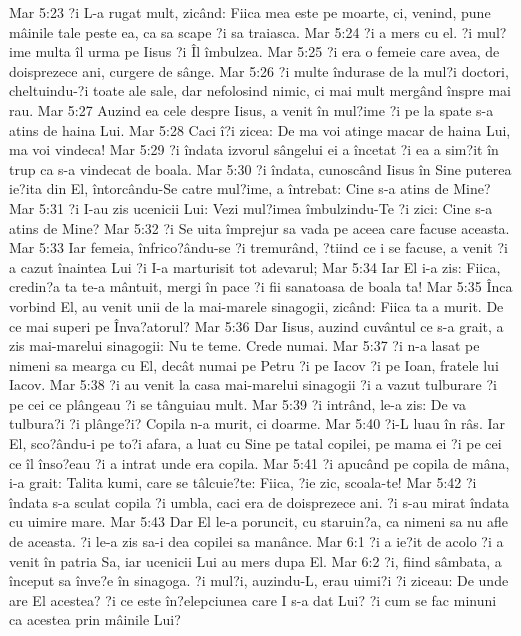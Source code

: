 Mar 5:23  ?i L-a rugat mult, zicând: Fiica mea este pe moarte, ci, venind, pune mâinile tale peste ea, ca sa scape ?i sa traiasca.
Mar 5:24  ?i a mers cu el. ?i mul?ime multa îl urma pe Iisus ?i Îl îmbulzea.
Mar 5:25  ?i era o femeie care avea, de doisprezece ani, curgere de sânge.
Mar 5:26  ?i multe îndurase de la mul?i doctori, cheltuindu-?i toate ale sale, dar nefolosind nimic, ci mai mult mergând înspre mai rau.
Mar 5:27  Auzind ea cele despre Iisus, a venit în mul?ime ?i pe la spate s-a atins de haina Lui.
Mar 5:28  Caci î?i zicea: De ma voi atinge macar de haina Lui, ma voi vindeca!
Mar 5:29  ?i îndata izvorul sângelui ei a încetat ?i ea a sim?it în trup ca s-a vindecat de boala.
Mar 5:30  ?i îndata, cunoscând Iisus în Sine puterea ie?ita din El, întorcându-Se catre mul?ime, a întrebat: Cine s-a atins de Mine?
Mar 5:31  ?i I-au zis ucenicii Lui: Vezi mul?imea îmbulzindu-Te ?i zici: Cine s-a atins de Mine?
Mar 5:32  ?i Se uita împrejur sa vada pe aceea care facuse aceasta.
Mar 5:33  Iar femeia, înfrico?ându-se ?i tremurând, ?tiind ce i se facuse, a venit ?i a cazut înaintea Lui ?i I-a marturisit tot adevarul;
Mar 5:34  Iar El i-a zis: Fiica, credin?a ta te-a mântuit, mergi în pace ?i fii sanatoasa de boala ta!
Mar 5:35  Înca vorbind El, au venit unii de la mai-marele sinagogii, zicând: Fiica ta a murit. De ce mai superi pe Înva?atorul?
Mar 5:36  Dar Iisus, auzind cuvântul ce s-a grait, a zis mai-marelui sinagogii: Nu te teme. Crede numai.
Mar 5:37  ?i n-a lasat pe nimeni sa mearga cu El, decât numai pe Petru ?i pe Iacov ?i pe Ioan, fratele lui Iacov.
Mar 5:38  ?i au venit la casa mai-marelui sinagogii ?i a vazut tulburare ?i pe cei ce plângeau ?i se tânguiau mult.
Mar 5:39  ?i intrând, le-a zis: De va tulbura?i ?i plânge?i? Copila n-a murit, ci doarme.
Mar 5:40  ?i-L luau în râs. Iar El, sco?ându-i pe to?i afara, a luat cu Sine pe tatal copilei, pe mama ei ?i pe cei ce îl înso?eau ?i a intrat unde era copila.
Mar 5:41  ?i apucând pe copila de mâna, i-a grait: Talita kumi, care se tâlcuie?te: Fiica, ?ie zic, scoala-te!
Mar 5:42  ?i îndata s-a sculat copila ?i umbla, caci era de doisprezece ani. ?i s-au mirat îndata cu uimire mare.
Mar 5:43  Dar El le-a poruncit, cu staruin?a, ca nimeni sa nu afle de aceasta. ?i le-a zis sa-i dea copilei sa manânce.
Mar 6:1  ?i a ie?it de acolo ?i a venit în patria Sa, iar ucenicii Lui au mers dupa El.
Mar 6:2  ?i, fiind sâmbata, a început sa înve?e în sinagoga. ?i mul?i, auzindu-L, erau uimi?i ?i ziceau: De unde are El acestea? ?i ce este în?elepciunea care I s-a dat Lui? ?i cum se fac minuni ca acestea prin mâinile Lui?
